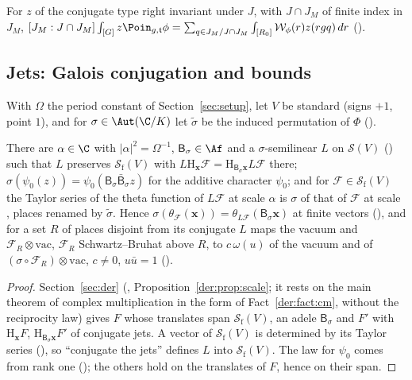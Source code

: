 For $z$ of the conjugate type right invariant under $J$, with $J\cap J_M$ of finite index in $J_M$, $[J_M:J\cap J_M]\int_{[G]}z\Poin_{g,\mathfrak t}\phi=\sum_{q\in J_M/J\cap J_M}
\int_{[R_0]}\mathcal W_\phi(r)z(rgq)\,dr$ ().

\subsection{Jets: Galois conjugation and bounds}\label{ub-objects:sec:jets}

With $\Omega$ the period constant of Section~\ref{sec:setup}, let $V$ be standard (signs $+1$, point $1$),
and for $\sigma\in\Aut(\C/K)$ let $\tilde\sigma$ be the induced permutation of $\Phi$
().

\begin{theorem}\label{ub-objects:thm:conj}
There are $\alpha\in\C$ with $|\alpha|^2=\Omega^{-1}$, $\mathsf B_\sigma\in\Af$ and a $\sigma$-semilinear $L$ on $\mathscr S(V)$
() such that $L$ preserves $\mathscr S_{\mathrm f}(V)$ with
$L\mathrm H_{\mathbf x}\mathcal F=\mathrm H_{\mathsf B_\sigma\mathbf x}L\mathcal F$ there; $\sigma(\psi_0(z))=\psi_0(\mathsf B_\sigma\bar{\mathsf B}_\sigma z)$ for the additive character
$\psi_0$; and for $\mathcal F\in\mathscr S_{\mathrm f}(V)$ the Taylor series of the theta function of $L\mathcal F$ at scale $\alpha$
is $\sigma$ of that of $\mathcal F$ at scale , places renamed by $\tilde\sigma$.
Hence $\sigma(\theta_{\mathcal F}(\mathbf x))=\theta_{L\mathcal F}(\mathsf B_\sigma\mathbf x)$ at finite vectors
(), and for a set $R$ of places disjoint
from its conjugate $L$ maps the vacuum and $\mathcal F_R\otimes\mathrm{vac}$, $\mathcal F_R$ Schwartz--Bruhat above
$R$, to $c\,\omega(u)$ of the vacuum and of $(\sigma\circ\mathcal F_R)\otimes\mathrm{vac}$,
$c\ne0$, $u\bar u=1$ ().
\end{theorem}

\begin{proof}
Section~\ref{sec:der} (, Proposition~\ref{der:prop:scale};
it rests on the main theorem of complex multiplication in the form of Fact~\ref{der:fact:cm}, without
the reciprocity law) gives $F$ whose translates span $\mathscr S_{\mathrm f}(V)$,
an adele $\mathsf B_\sigma$ and $F'$ with $\mathrm H_{\mathbf x}F$, $\mathrm H_{\mathsf B_\sigma\mathbf x}F'$ of conjugate jets. A vector of
$\mathscr S_{\mathrm f}(V)$ is determined by its Taylor series (), so
``conjugate the jets'' defines $L$ into $\mathscr S_{\mathrm f}(V)$. The law for $\psi_0$ comes from rank one
(); the others hold on the translates of $F$,
hence on their span.
\end{proof}

